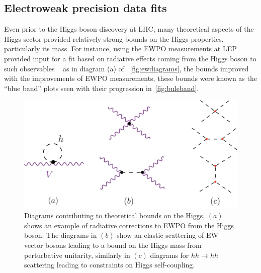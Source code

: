 \subsection{Electroweak precision data fits }
Even prior to the Higgs boson discovery at LHC,  many theoretical aspects of the Higgs sector provided relatively strong bounds on the Higgs properties, particularly its mass. For instance, using the EWPO measurements at LEP provided input for a fit based on radiative effects coming from the Higgs boson to such observables ~\cite{ALEPH:2005ab} as in diagram (a) of ~\autoref{fig:ewdiagrams}, the bounds improved with the improvements of EWPO measurements, these bounds were known as the ``blue band'' plots seen with their progression in~\autoref{fig:buleband}.
\begin{figure}[t!]
	\begin{center}
		\includegraphics[width=.7 \linewidth]{figures/theoretical_const}
		\caption{Diagrams contributing to theoretical bounds on the Higgs, $(a) $ shows an example of radiative corrections to EWPO from the Higgs boson. The diagrams in $(b)$ show an elastic scattering of EW vector bosons leading to a bound on the Higgs mass from perturbative unitarity, similarly in $(c)$ diagrams for $hh \to hh$ scattering leading to constraints on Higgs self-coupling.}
		\label{fig:ewdiagrams}
	\end{center}
\end{figure}

